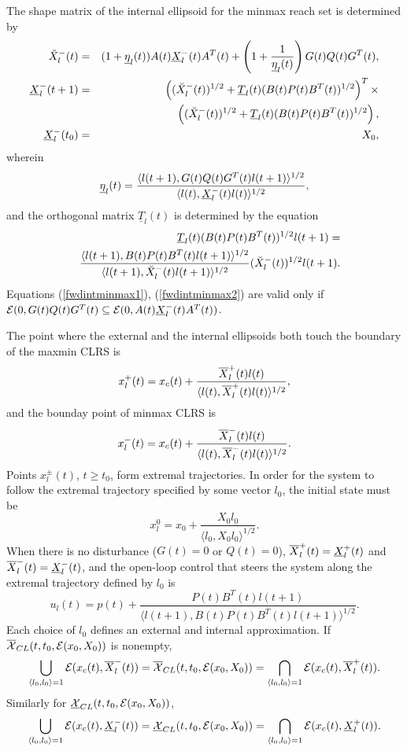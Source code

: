 The shape matrix of the internal ellipsoid for the minmax reach set
is determined by
\begin{eqnarray}
\UUXM(t) & = & (1+\underline{\eta}_l(t))A(t)\UXM(t)A^T(t) +
\left(1+\frac{1}{\underline{\eta}_l(t)}\right)
G(t)Q(t)G^T(t), \label{fwdintminmax1} \\
\UXM(t+1) & = & \left((\UUXM(t))^{1/2} +
\underline{T}_l(t)(B(t)P(t)B^T(t))^{1/2}\right)^T
\times \nonumber \\
& &\left((\UUXM(t))^{1/2} + \underline{T}_l(t)(B(t)P(t)B^T(t))^{1/2}\right),
\label{fwdintminmax2}\\
\UXM(t_0) & = & X_0, \label{fwdintminmax3}
\end{eqnarray}
wherein
\[ \underline{\eta}_l(t) = \frac{\langle l(t+1),
G(t)Q(t)G^T(t)l(t+1)\rangle^{1/2}}{\langle l(t),
\UXM(t)l(t)\rangle^{1/2}}, \]
and the orthogonal matrix $\underline{T}_l(t)$ is determined by the equation
\begin{eqnarray*}
& & \underline{T}_l(t)(B(t)P(t)B^T(t))^{1/2}l(t+1) = \\
& & \frac{\langle l(t+1),
B(t)P(t)B^T(t)l(t+1)\rangle^{1/2}}{\langle l(t+1),
\UUXM(t)l(t+1)\rangle^{1/2}}(\UUXM(t))^{1/2}l(t+1).
\end{eqnarray*}
Equations (\ref{fwdintminmax1}), (\ref{fwdintminmax2}) are valid only if
$\EE(0,G(t)Q(t)G^T(t)\subseteq\EE(0,A(t)\UXM(t)A^T(t))$.

The point where the external and the internal ellipsoids both touch
the boundary of the maxmin CLRS is
\[ x_l^+(t) = x_c(t) + \frac{\OXP(t)l(t)}{\langle l(t),
\OXP(t)l(t)\rangle^{1/2}} ,\]
and the bounday point of minmax CLRS is
\[ x_l^-(t) = x_c(t) + \frac{\OXM(t)l(t)}{\langle l(t),
\OXM(t)l(t)\rangle^{1/2}} .\]
Points $x^{\pm}_l(t)$, $t\geq t_0$, form extremal trajectories.
In order for the system to follow the extremal trajectory specified by
some vector $l_0$, the initial state must be
\begin{equation}
x_l^0 = x_0 + \frac{X_0l_0}{\langle l_0, X_0l_0\rangle^{1/2}}. \label{dx0l}
\end{equation}
When there is no disturbance ($G(t)=0$ or $Q(t)=0$),
$\OXP(t)=\UXP(t)$ and $\OXM(t)=\UXM(t)$, and
the open-loop control that steers the system along the extremal trajectory
defined by $l_0$ is
\begin{equation}
u_l(t) = p(t) + \frac{P(t)B^T(t)l(t+1)}{\langle l(t+1),
B(t)P(t)B^T(t)l(t+1)\rangle^{1/2}}. \label{udt}
\end{equation}
Each choice of $l_0$ defines an external and internal approximation.
If $\OXCL(t,t_0,\EE(x_0,X_0))$ is nonempty,
\[ \bigcup_{\langle l_0,l_0\rangle=1}\EE(x_c(t),\OXM(t)) =
\OXCL(t,t_0,\EE(x_0,X_0)) =
\bigcap_{\langle l_0,l_0\rangle=1}\EE(x_c(t),\OXP(t)). \]
Similarly for $\UXCL(t,t_0,\EE(x_0,X_0))$,
\[ \bigcup_{\langle l_0,l_0\rangle=1}\EE(x_c(t),\UXM(t)) =
\UXCL(t,t_0,\EE(x_0,X_0)) =
\bigcap_{\langle l_0,l_0\rangle=1}\EE(x_c(t),\UXP(t)). \]






